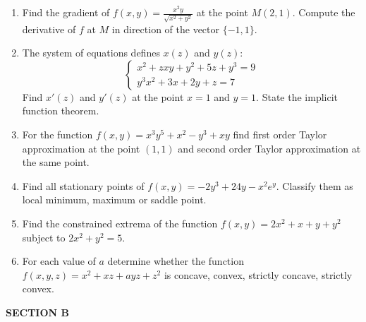 \documentclass[12pt]{article} %
\theoremstyle{definition} %
\begin{document}
\begin{enumerate}
	\item Find the gradient of $f(x,y) =\frac{x^2y}{\sqrt{x^2+y^2}}$
at the point $M(2,1)$. Compute the derivative of $f$ at $M$ in direction of the vector $\{-1, 1\}$.
	\item The system of equations defines $x(z)$ and $y(z)$:
\begin{equation}
\begin{cases}
x^2+zxy+y^2+5z+y^3=9 \\
y^3x^2+3x+2y+z=7 \nonumber
\end{cases}
\end{equation}
Find $x'(z)$ and $y'(z)$ at the point $x=1$ and $y=1$. State the implicit function theorem.
 \item For the function $f(x,y)=x^3y^5+x^2-y^3+xy$ find first order Taylor approximation at the point $(1,1)$ and second order Taylor approximation at the same point.
	\item Find all stationary points of $f(x,y) = -2y^3+24y-x^2e^y$. Classify them as local minimum, maximum or saddle point.
	\item Find the constrained extrema of the function $f(x,y)=2x^2+x+y+y^2$ subject to $2x^2+y^2=5$.
	\item  For each value of $a$ determine whether the function $f(x,y,z)=x^2+xz+ayz+z^2$ is concave, convex, strictly concave, strictly convex.
\end{enumerate}

\textbf{SECTION B}
\end{document}

